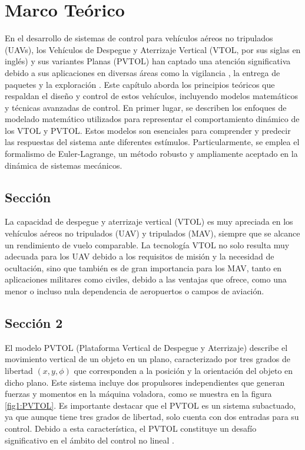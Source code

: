 \chapter{Marco Teórico}

En el desarrollo de sistemas de control para vehículos aéreos no tripulados (UAVs), los Vehículos de Despegue y Aterrizaje Vertical (VTOL, por sus siglas en inglés) y sus variantes Planas (PVTOL) han captado una atención significativa debido a sus aplicaciones en diversas áreas como la vigilancia \cite{johnson1997arti}, la entrega de paquetes \cite{9129495} y la exploración \cite{5278262}. Este capítulo aborda los principios teóricos que respaldan el diseño y control de estos vehículos, incluyendo modelos matemáticos y técnicas avanzadas de control.
En primer lugar, se describen los enfoques de modelado matemático utilizados para representar el comportamiento dinámico de los VTOL y PVTOL. Estos modelos son esenciales para comprender y predecir las respuestas del sistema ante diferentes estímulos. Particularmente, se emplea el formalismo de Euler-Lagrange, un método robusto y ampliamente aceptado en la dinámica de sistemas mecánicos.

\section{Sección}

La capacidad de despegue y aterrizaje vertical (VTOL) es muy apreciada en los vehículos aéreos no tripulados (UAV) y tripulados (MAV), siempre que se alcance un rendimiento de vuelo comparable. La tecnología VTOL no solo resulta muy adecuada para los UAV debido a los requisitos de misión y la necesidad de ocultación, sino que también es de gran importancia para los MAV, tanto en aplicaciones militares como civiles, debido a las ventajas que ofrece, como una menor o incluso nula dependencia de aeropuertos o campos de aviación.

\section{Sección 2}

El modelo PVTOL (Plataforma Vertical de Despegue y Aterrizaje) describe el movimiento vertical de un objeto en un plano, caracterizado por tres grados de libertad $(x, y, \phi)$ que corresponden a la posición y la orientación del objeto en dicho plano. Este sistema incluye dos propulsores independientes que generan fuerzas y momentos en la máquina voladora, como se muestra en la figura \ref{fig1:PVTOL}. Es importante destacar que el PVTOL es un sistema subactuado, ya que aunque tiene tres grados de libertad, solo cuenta con dos entradas para su control. Debido a esta característica, el PVTOL constituye un desafío significativo en el ámbito del control no lineal \cite{lin1999robust}.


